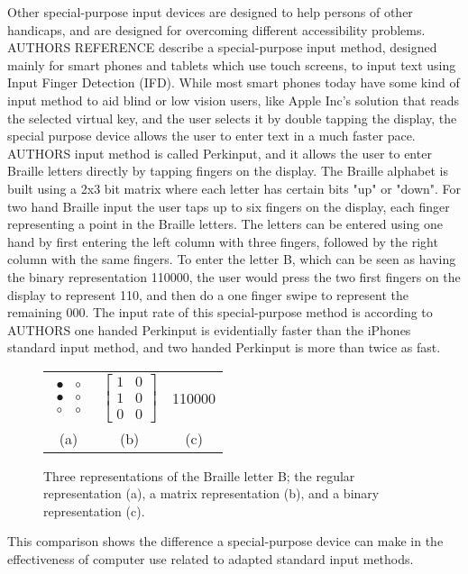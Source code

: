 Other special-purpose input devices are designed to help persons of other handicaps, and are designed for overcoming different accessibility problems. AUTHORS REFERENCE describe a special-purpose input method, designed mainly for smart phones and tablets which use touch screens, to input text using Input Finger Detection (IFD). While most smart phones today have some kind of input method to aid blind or low vision users, like Apple Inc's solution that reads the selected virtual key, and the user selects it by double tapping the display, the special purpose device allows the user to enter text in a much faster pace. AUTHORS input method is called Perkinput, and it allows the user to enter Braille letters directly by tapping fingers on the display. The Braille alphabet is built using a 2x3 bit matrix where each letter has certain bits "up" or "down". For two hand Braille input the user taps up to six fingers on the display, each finger representing a point in the Braille letters. The letters can be entered using one hand by first entering the left column with three fingers, followed by the right column with the same fingers. To enter the letter B, which can be seen as having the binary representation 110000, the user would press the two first fingers on the display to represent 110, and then do a one finger swipe to represent the remaining 000. The input rate of this special-purpose method is according to AUTHORS one handed Perkinput is evidentially faster than the iPhones standard input method, and two handed Perkinput is more than twice as fast.

\begin{figure}[h!]

	\centering

\begin{tabular}{c c c}

$
\begin{array}{cc}
\bullet & \circ \\
\bullet & \circ \\
\circ & \circ \end{array}
$

&

$
\left[ \begin{array}{cc}
1 & 0 \\
1 & 0 \\
0 & 0 \end{array} \right]
$ 

&

110000 \\

(a) & (b) & (c)

\end{tabular}


	\caption{Three representations of the Braille letter B; the regular representation (a), a matrix representation (b), and a binary representation (c).}

\end{figure}

This comparison shows the difference a special-purpose device can make in the effectiveness of computer use related to adapted standard input methods. 